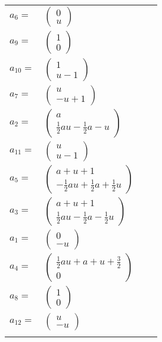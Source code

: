 \documentclass[1p]{elsarticle_modified}
\theoremstyle{definition}
\begin{document}
\begin{tabular}{m{7pt} m{180pt} m{7pt} m{180pt} }
\flushright $a_{6}=$&$\begin{pmatrix}0\\u\end{pmatrix}$ \\
\flushright $a_{9}=$&$\begin{pmatrix}1\\0\end{pmatrix}$ \\
\flushright $a_{10}=$&$\begin{pmatrix}1\\u-1\end{pmatrix}$ \\
\flushright $a_{7}=$&$\begin{pmatrix}u\\- u+1\end{pmatrix}$ \\
\flushright $a_{2}=$&$\begin{pmatrix}a\\\frac{1}{2} a u-\frac{1}{2} a- u\end{pmatrix}$ \\
\flushright $a_{11}=$&$\begin{pmatrix}u\\u-1\end{pmatrix}$ \\
\flushright $a_{5}=$&$\begin{pmatrix}a+u+1\\-\frac{1}{2} a u+\frac{1}{2} a+\frac{1}{2} u\end{pmatrix}$ \\
\flushright $a_{3}=$&$\begin{pmatrix}a+u+1\\\frac{1}{2} a u-\frac{1}{2} a-\frac{1}{2} u\end{pmatrix}$ \\
\flushright $a_{1}=$&$\begin{pmatrix}0\\- u\end{pmatrix}$ \\
\flushright $a_{4}=$&$\begin{pmatrix}\frac{1}{2} a u+a+u+\frac{3}{2}\\0\end{pmatrix}$ \\
\flushright $a_{8}=$&$\begin{pmatrix}1\\0\end{pmatrix}$ \\
\flushright $a_{12}=$&$\begin{pmatrix}u\\- u\end{pmatrix}$\\&\end{tabular}
\end{document}
